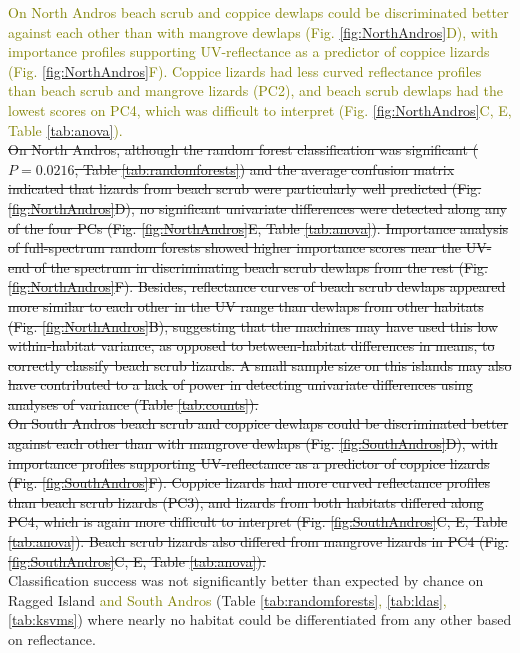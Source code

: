 \textcolor{olive}{On North Andros beach scrub and coppice dewlaps could be discriminated better against each other than with mangrove dewlaps (Fig. \ref{fig:NorthAndros}D), with importance profiles supporting UV-reflectance as a predictor of coppice lizards (Fig. \ref{fig:NorthAndros}F). Coppice lizards had less curved reflectance profiles than beach scrub and mangrove lizards (PC2), and beach scrub dewlaps had the lowest scores on PC4, which was difficult to interpret (Fig. \ref{fig:NorthAndros}C, E, Table \ref{tab:anova}).}\\

\sout{On North Andros, although the random forest classification was significant ($P = 0.0216$, Table \ref{tab:randomforests}) and the average confusion matrix indicated that lizards from beach scrub were particularly well predicted (Fig. \ref{fig:NorthAndros}D), no significant univariate differences were detected along any of the four PCs (Fig. \ref{fig:NorthAndros}E, Table \ref{tab:anova}). Importance analysis of full-spectrum random forests showed higher importance scores near the UV-end of the spectrum in discriminating beach scrub dewlaps from the rest (Fig. \ref{fig:NorthAndros}F). Besides, reflectance curves of beach scrub dewlaps appeared more similar to each other in the UV range than dewlaps from other habitats (Fig. \ref{fig:NorthAndros}B), suggesting that the machines may have used this low within-habitat variance, as opposed to between-habitat differences in means, to correctly classify beach scrub lizards. A small sample size on this islands may also have contributed to a lack of power in detecting univariate differences using analyses of variance (Table \ref{tab:counts}).}\\

\sout{On South Andros beach scrub and coppice dewlaps could be discriminated better against each other than with mangrove dewlaps (Fig. \ref{fig:SouthAndros}D), with importance profiles supporting UV-reflectance as a predictor of coppice lizards (Fig. \ref{fig:SouthAndros}F). Coppice lizards had more curved reflectance profiles than beach scrub lizards (PC3), and lizards from both habitats differed along PC4, which is again more difficult to interpret (Fig. \ref{fig:SouthAndros}C, E, Table \ref{tab:anova}). Beach scrub lizards also differed from mangrove lizards in PC4 (Fig. \ref{fig:SouthAndros}C, E, Table \ref{tab:anova}).}\\

Classification success was not significantly better than expected by chance on Ragged Island \textcolor{olive}{and South Andros} (Table \ref{tab:randomforests}\textcolor{olive}{, \ref{tab:ldas}, \ref{tab:ksvms}}) where nearly no habitat could be differentiated from any other based on reflectance.